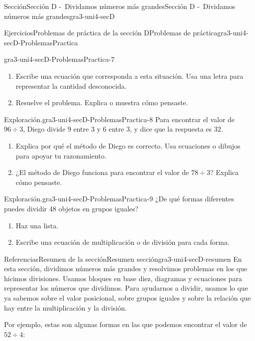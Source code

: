 \documentclass[twoside,10pt,]{article}
\begin{document}
\begin{sectionptx}{Sección}{Sección D -~Dividamos números más grandes}{}{Sección D -~Dividamos números más grandes}{}{}{gra3-uni4-secD}
\begin{exercises-subsection}{Ejercicios}{Problemas de práctica de la sección D}{}{Problemas de práctica}{}{}{gra3-uni4-secD-ProblemasPractica}
\begin{divisionexercise}{5}{}{}{gra3-uni4-secD-ProblemasPractica-7}
%
\begin{enumerate}[label={(\alph*)}]
\item{}Escribe una ecuación que corresponda a esta situación. Usa una letra para representar la cantidad desconocida.%
\item{}Resuelve el problema. Explica o muestra cómo pensaste.%
\end{enumerate}
\end{divisionexercise}%
\begin{divisionexercise}{6}{Exploración.}{}{gra3-uni4-secD-ProblemasPractica-8}%
Para encontrar el valor de \(96 \div 3\), Diego divide \(9\) entre \(3\) y \(6\) entre \(3\), y dice que la respuesta es \(32\).%
%
\begin{enumerate}[label={(\alph*)}]
\item{}Explica por qué el método de Diego es correcto. Usa ecuaciones o dibujos para apoyar tu razonamiento.%
\item{}¿El método de Diego funciona para encontrar el valor de \(78 \div 3\)? Explica cómo pensaste.%
\end{enumerate}
\end{divisionexercise}%
\begin{divisionexercise}{7}{Exploración.}{}{gra3-uni4-secD-ProblemasPractica-9}%
¿De qué formas diferentes puedes dividir 48 objetos en grupos iguales?%
%
\begin{enumerate}[label={(\alph*)}]
\item{}Haz una lista.%
\item{}Escribe una ecuación de multiplicación o de división para cada forma.%
\end{enumerate}
\end{divisionexercise}%
\end{exercises-subsection}
%
%
\typeout{************************************************}
\typeout{************************************************}
%
\begin{references-subsection}{Referencias}{Resumen de la sección}{}{Resumen sección}{}{}{gra3-uni4-secD-resumen}
En esta sección, dividimos números más grandes y resolvimos problemas en los que hicimos divisiones. Usamos bloques en base diez, diagramas y ecuaciones para representar los números que dividimos. Para ayudarnos a dividir, usamos lo que ya sabemos sobre el valor posicional, sobre grupos iguales y sobre la relación que hay entre la multiplicación y la división.%
\par
Por ejemplo, estas son algunas formas en las que podemos encontrar el valor de \(52 \div 4\):%

\end{references-subsection}
\end{sectionptx}
\end{document}
